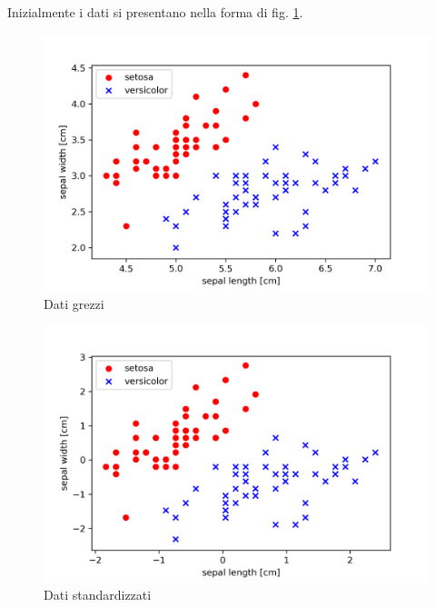 Inizialmente i dati si presentano nella forma di fig. \ref{fig:iris_grezzi}. 

\begin{figure}[h]
    \centering
    \includegraphics[width=\linewidth]{gfx/iris/iris2features}
    \caption{Dati grezzi}
    \label{fig:iris_grezzi}
\end{figure}

\begin{figure}[h]
    \centering
    \includegraphics[width=\linewidth]{gfx/iris/iris2scaled}
    \caption{Dati standardizzati}
    \label{fig:iris_standard}
\end{figure}

